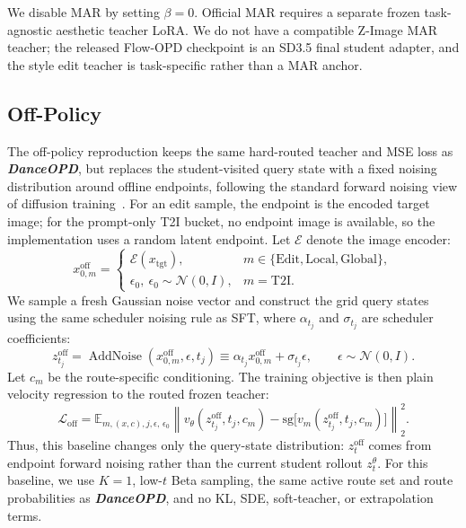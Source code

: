\documentclass{llmxive}
\providecommand{\name}{\textsl{\textbf{DanceOPD}}\xspace}
\begin{document}
We disable MAR by setting $\beta{=}0$. Official MAR requires a separate frozen task-agnostic aesthetic teacher LoRA. We do not have a compatible Z-Image MAR teacher; the released Flow-OPD checkpoint is an SD3.5 final student adapter, and the style edit teacher is task-specific rather than a MAR anchor.


\vspace{0.2cm}


\subsection{Off-Policy}
\label{app:offpolicy-reproduction}

The off-policy reproduction keeps the same hard-routed teacher and MSE loss as \name{}, but replaces the student-visited query state with a fixed noising distribution around offline endpoints, following the standard forward noising view of diffusion training~\cite{ho2020denoising}. For an edit sample, the endpoint is the encoded target image; for the prompt-only T2I bucket, no endpoint image is available, so the implementation uses a random latent endpoint. Let $\mathcal{E}$ denote the image encoder:
\begin{equation}
  x^{\mathrm{off}}_{0,m}=
  \begin{cases}
    \mathcal{E}(x_{\mathrm{tgt}}), & m\in\{\mathrm{Edit},\mathrm{Local},\mathrm{Global}\},\\
    \epsilon_0,\ \epsilon_0\sim\mathcal{N}(0,I), & m=\mathrm{T2I}.
  \end{cases}
\end{equation}
We sample a fresh Gaussian noise vector and construct the grid query states using the same scheduler noising rule as SFT, where $\alpha_{t_j}$ and $\sigma_{t_j}$ are scheduler coefficients:
\begin{equation}
  z^{\mathrm{off}}_{t_j}
  =\operatorname{AddNoise}(x^{\mathrm{off}}_{0,m},\epsilon,t_j)
  \equiv \alpha_{t_j}x^{\mathrm{off}}_{0,m}+\sigma_{t_j}\epsilon,
  \qquad \epsilon\sim\mathcal{N}(0,I).
\end{equation}
Let $c_m$ be the route-specific conditioning. The training objective is then plain velocity regression to the routed frozen teacher:
\begin{equation}
  \mathcal{L}_{\mathrm{off}}
  =\mathbb{E}_{m,(x,c),j,\epsilon,\,\epsilon_0}
  \left\|v_{\theta}(z^{\mathrm{off}}_{t_j},t_j,c_m)
  -\mathrm{sg}\!\bigl[v_m(z^{\mathrm{off}}_{t_j},t_j,c_m)\bigr]\right\|_2^2 .
\end{equation}
Thus, this baseline changes only the query-state distribution: $z^{\mathrm{off}}_{t}$ comes from endpoint forward noising rather than the current student rollout $z_t^{\theta}$. For this baseline, we use $K{=}1$, low-$t$ Beta sampling, the same active route set and route probabilities as \name{}, and no KL, SDE, soft-teacher, or extrapolation terms.
\end{document}

